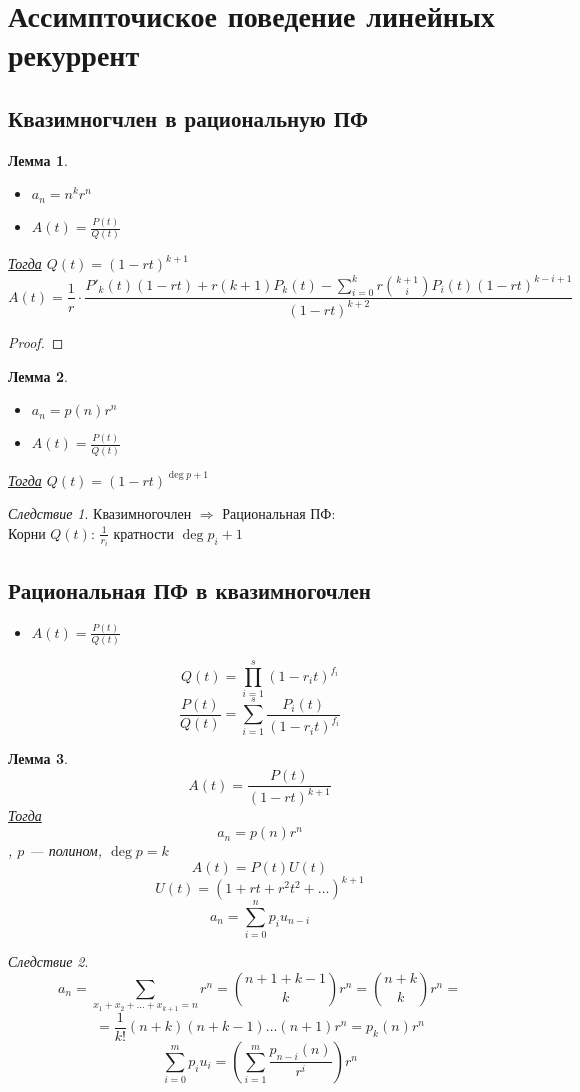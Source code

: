 \documentclass[oneside]{book}
\newcommand{\todo}{{\color{red}\fbox{\text{Доделать}}}}
\theoremstyle{plain}
\newtheorem{lemma}{Лемма}
\theoremstyle{remark}
\newtheorem{corollary}{Следствие}[theorem]
\theoremstyle{definition}
\begin{document}
\section{Ассимпточиское поведение линейных рекуррент}
\label{sec:org20e6208}
\subsection{Квазимногчлен в рациональную ПФ}
\label{sec:orgc97c7db}
\begin{lemma}
\-
\begin{itemize}
\item \(a_n = n^k r^n\)
\item \(A(t) = \frac{P(t)}{Q(t)}\)
\end{itemize}
\uline{Тогда} \(Q(t) = (1 - rt)^{k + 1}\)
\[ A(t) = \frac{1}{r}\cdot \frac{P'_k(t)(1 - rt) + r(k + 1)P_k(t) - \sum_{i = 0}^k r \binom{k + 1}{i} P_i(t) (1 - rt)^{k - i + 1}}{(1 - rt)^{k + 2}} \]
\end{lemma}
\begin{proof}
\todo
\end{proof}
\begin{lemma}
\-
\begin{itemize}
\item \(a_n = p(n) r^n\)
\item \(A(t) = \frac{P(t)}{Q(t)}\)
\end{itemize}
\uline{Тогда} \(Q(t) = (1 - rt)^{\deg p + 1}\)
\end{lemma}
\begin{corollary}
Квазимногочлен \(\Rightarrow\) Рациональная ПФ: \\
Корни \(Q(t)\): \(\frac{1}{r_i}\) кратности \(\deg p_i + 1\)
\end{corollary}

\subsection{Рациональная ПФ в квазимногочлен}
\label{sec:org9ddf799}
\begin{itemize}
\item \(A(t) = \frac{P(t)}{Q(t)}\)
\end{itemize}
\[ Q(t) = \prod_{i = 1}^s (1 - r_it)^{f_i} \]
\[ \frac{P(t)}{Q(t)} = \sum_{i = 1}^s \frac{P_i(t)}{(1 - r_i t)^{f_i}} \]
\begin{lemma}
\[ A(t) = \frac{P(t)}{(1 - rt)^{k + 1}} \]
\uline{Тогда} \[ a_n = p(n) r^n \], \(p\) --- полином, \(\deg p = k\)
\[ A(t) = P(t) U(t) \]
\[ U(t) = (1 + rt + r^2 t^2 + \dots)^{k + 1} \]
\[ a_n = \sum_{i = 0}^n p_i u_{n - i} \]
\end{lemma}
\begin{corollary}
\[ a_n = \sum_{x_1 + x_2 + \dots + x_{k + 1} = n} r^n = \binom{n + 1 + k - 1}{k}r^n = \binom{n + k}{k}r^n = \]
\[ = \frac{1}{k!}(n + k)(n + k - 1)\dots(n + 1)r^n = p_k(n)r^n \]
\[ \sum_{i = 0}^m p_i u_i = \left(\sum_{i = 1}^m \frac{p_{n - i}(n)}{r^i}\right)r^n \]
\end{corollary}
\end{document}
